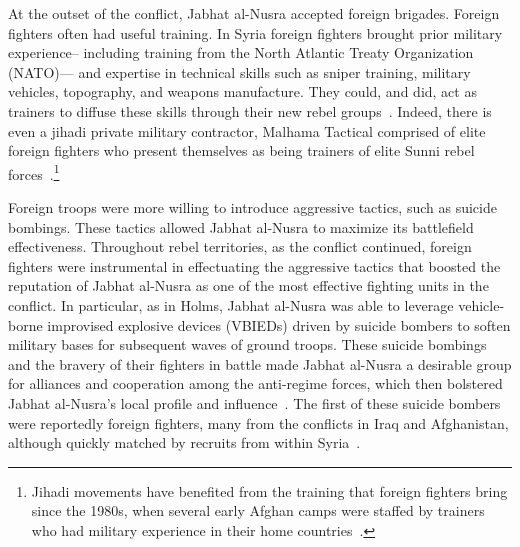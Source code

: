 At the outset of the conflict, Jabhat al-Nusra accepted foreign brigades. Foreign fighters often had useful training.  In Syria foreign fighters brought prior military experience-- including training from the North Atlantic Treaty Organization (NATO)--- and expertise in technical skills such as sniper training, military vehicles, topography, and weapons manufacture. They could, and did, act as trainers to diffuse these skills through their new rebel groups~\autocite[136]{mironova2019freedom}. Indeed, there is even a jihadi private military contractor, Malhama Tactical comprised of elite foreign fighters who present themselves as being trainers of elite Sunni rebel forces~\autocite{komar2017blackwater}.\footnote{Jihadi movements have benefited from the training that foreign fighters bring since the 1980s, when several early Afghan camps were staffed by trainers who had military experience in their home countries~\autocite{anas2019mountains, hamid2015arabs, levy2017exile, miller2015audacious, nasiri2007inside}.}  

Foreign troops were more willing to introduce aggressive tactics, such as suicide bombings. These tactics allowed Jabhat al-Nusra to maximize its battlefield effectiveness. Throughout rebel territories, as the conflict continued, foreign fighters were instrumental in effectuating the aggressive tactics that boosted the reputation of Jabhat al-Nusra as one of the most effective fighting units in the conflict. In particular, as in Holms, Jabhat al-Nusra was able to leverage vehicle-borne improvised explosive devices (VBIEDs) driven by suicide bombers to soften military bases for subsequent waves of ground troops. These suicide bombings and the bravery of their fighters in battle made Jabhat al-Nusra a desirable group for alliances and cooperation among the anti-regime forces, which then bolstered Jabhat al-Nusra's local profile and influence~\autocite{lister2016profiling}.  The first of these suicide bombers were reportedly foreign fighters, many from the conflicts in Iraq and Afghanistan, although quickly matched by recruits from within Syria~\autocite{ignatius2012affiliate, sherlock2012inside}. 

